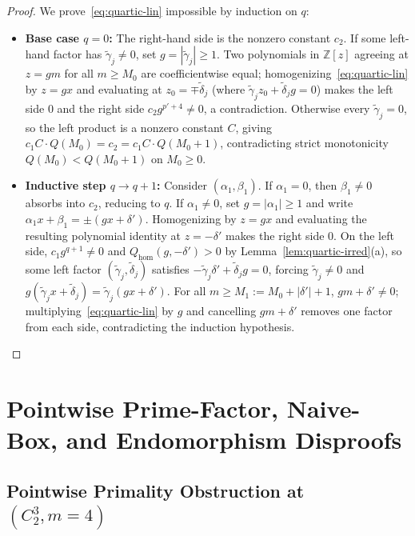 \documentclass[11pt,a4paper]{article}
\newcommand{\coloneqq}{\mathrel{:=}}
\theoremstyle{definition}
\begin{document}
\begin{proof}
We prove~\eqref{eq:quartic-lin} impossible by induction on $q$:
\begin{itemize}
  \item \textbf{Base case $q = 0$:} The right-hand side is the nonzero constant $c_2$. If some
        left-hand factor has $\tilde{\gamma}_j \ne 0$, set $g = |\tilde{\gamma}_j| \ge 1$. Two
        polynomials in $\mathbb{Z}[z]$ agreeing at $z = g m$ for all $m \ge M_0$ are coefficientwise
        equal; homogenizing~\eqref{eq:quartic-lin} by $z = g x$ and evaluating at $z_0 = \mp
        \tilde{\delta}_j$ (where $\tilde{\gamma}_j z_0 + \tilde{\delta}_j g = 0$) makes the left
        side $0$ and the right side $c_2 g^{p'+4} \ne 0$, a contradiction. Otherwise every
        $\tilde{\gamma}_j = 0$, so the left product is a nonzero constant $C$, giving $c_1 C \cdot
        Q(M_0) = c_2 = c_1 C \cdot Q(M_0 + 1)$, contradicting strict monotonicity $Q(M_0) < Q(M_0+1)$
        on $M_0 \ge 0$.
  \item \textbf{Inductive step $q \to q + 1$:} Consider $(\alpha_1, \beta_1)$. If $\alpha_1 = 0$,
        then $\beta_1 \ne 0$ absorbs into $c_2$, reducing to $q$. If $\alpha_1 \ne 0$, set $g =
        |\alpha_1| \ge 1$ and write $\alpha_1 x + \beta_1 = \pm(g x + \delta')$. Homogenizing
        by $z = g x$ and evaluating the resulting polynomial identity at $z = -\delta'$ makes the
        right side $0$. On the left side, $c_1 g^{q+1} \ne 0$ and $Q_{\mathrm{hom}}(g, -\delta') > 0$
        by Lemma~\ref{lem:quartic-irred}(a), so some left factor $(\tilde{\gamma}_j,
        \tilde{\delta}_j)$ satisfies $-\tilde{\gamma}_j \delta' + \tilde{\delta}_j g = 0$, forcing
        $\tilde{\gamma}_j \ne 0$ and $g(\tilde{\gamma}_j x + \tilde{\delta}_j) = \tilde{\gamma}_j
        (g x + \delta')$. For all $m \ge M_1 \coloneqq M_0 + |\delta'| + 1$, $g m + \delta' \ne 0$;
        multiplying~\eqref{eq:quartic-lin} by $g$ and cancelling $g m + \delta'$ removes one factor
        from each side, contradicting the induction hypothesis. \qedhere
\end{itemize}
\end{proof}

\section{Pointwise Prime-Factor, Naive-Box, and Endomorphism Disproofs}

\subsection{Pointwise Primality Obstruction at \texorpdfstring{$(C_2^3, m=4)$}{(C2\^3, m=4)}}
\end{document}
